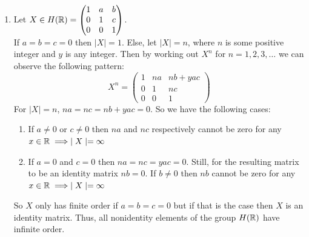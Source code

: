 \documentclass[12pt]{article}
\begin{document}
\begin{solution}
\begin{enumerate}
        If $a = 0$ or $c = 0$, $\mid X \mid = 2$. Else, 

         \[\begin{pmatrix}
            1 & 0 & ac \\ 0 & 1 & 0 \\ 0 & 0 & 1
        \end{pmatrix} \begin{pmatrix}
            1 & 0 & ac \\ 0 & 1 & 0 \\ 0 & 0 & 1
        \end{pmatrix}  = \begin{pmatrix}
            1 & 0 & 0 \\ 0 & 1 & 0 \\ 0 & 0 & 1
        \end{pmatrix}\]


        $\mid X \mid \leq 4 \implies \mid X \mid \bigl\vert  4$ but we know that $1, 2 \neq \mid X \mid \implies \mid X \mid = 4. $  \\ 
        Also if $X = I_n \implies \mid X\mid = 1$
        The order of elements in  $H(\Z/2\Z) = \{1, 2, 4\}$. 

        \item Let $X \in H(\mathbb R) =  \begin{pmatrix}
            1 & a & b \\ 0 & 1 & c \\ 0 & 0 & 1
        \end{pmatrix} $. \\
        If $a = b = c = 0$ then $\mid X \mid = 1.$ Else, 
        let $\mid X \mid = n$, where $n$ is some positive integer and $y$ is any integer. Then by working out $X^n$ for $n = {1, 2, 3, \ldots} $ we can observe the following pattern: 
        \[X^n = \begin{pmatrix}
            1 & na & nb + yac \\ 0 & 1 & nc \\ 0 & 0 & 1
        \end{pmatrix} \]
        For $\mid X \mid = n$, $na = nc = nb + yac = 0$. So we have the following cases: 
        \begin{enumerate}
            \item If $a \neq 0 $ or $c \neq 0$ then $na$ and $nc$ respectively cannot be zero for any \\ $x \in \mathbb R \implies \mid X \mid = \infty$ 
            \item If $a = 0$ and $c = 0$ then $na = nc = yac = 0$. Still, for the resulting matrix to be an identity matrix $nb = 0$. If $b \neq 0$ then $nb$ cannot be zero for any \\ $x \in \mathbb R \implies \mid X \mid = \infty$ 
        \end{enumerate}
        So $X$ only has finite order if $a = b = c = 0$ but if that is the case then $X$ is an identity matrix. Thus, all nonidentity elements of the group $H(\mathbb R)$ have infinite order.       
    \end{enumerate}
\end{solution}
\end{document}
